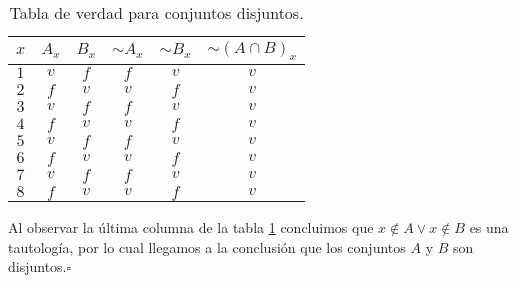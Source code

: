 \begin{table}[H]
\centering

\caption{Tabla de verdad para conjuntos disjuntos.}

\setlength\arrayrulewidth{1pt} 

\begin{tabular}{ccccc|c}
\arrayrulecolor{ptctitle}\hline\cellcolor{ptctitle!50}$x$ &
\cellcolor{ptctitle!50}$A_{x}$ &
\cellcolor{ptctitle!50}$B_{x}$ &
\cellcolor{ptctitle!50}$\sim A_{x}$ &
\cellcolor{ptctitle!50}$\sim B_{x}$ &
\cellcolor{ptctitle!50}$\sim\left(A\cap B\right)_{x}$\tabularnewline
\hline\cellcolor{ptcbackground}$1$ &
\cellcolor{ptcbackground} $v$ &
\cellcolor{ptcbackground} $f$ &
\cellcolor{ptcbackground} $f$ &
\cellcolor{ptcbackground} $v$ &
\cellcolor{ptcbackground}$v$\tabularnewline
\hline\cellcolor{gray!50}$2$ &
\cellcolor{gray!50} $f$ &
\cellcolor{gray!50} $v$ &
\cellcolor{gray!50} $v$ &
\cellcolor{gray!50} $f$ &
\cellcolor{gray!50}$v$\tabularnewline
\hline\cellcolor{ptcbackground}$3$ &
\cellcolor{ptcbackground} $v$ &
\cellcolor{ptcbackground} $f$ &
\cellcolor{ptcbackground} $f$ &
\cellcolor{ptcbackground} $v$ &
\cellcolor{ptcbackground} $v$\tabularnewline
\hline\cellcolor{gray!50}$4$ &
\cellcolor{gray!50} $f$ &
\cellcolor{gray!50} $v$ &
\cellcolor{gray!50} $v$ &
\cellcolor{gray!50} $f$ &
\cellcolor{gray!50} $v$\tabularnewline
\hline\cellcolor{ptcbackground}$5$ &
\cellcolor{ptcbackground} $v$ &
\cellcolor{ptcbackground} $f$ &
\cellcolor{ptcbackground} $f$ &
\cellcolor{ptcbackground} $v$ &
\cellcolor{ptcbackground} $v$\tabularnewline
\hline\cellcolor{gray!50}$6$ &
\cellcolor{gray!50} $f$ &
\cellcolor{gray!50} $v$ &
\cellcolor{gray!50} $v$ &
\cellcolor{gray!50} $f$ &
\cellcolor{gray!50} $v$\tabularnewline
\hline\cellcolor{ptcbackground}$7$ &
\cellcolor{ptcbackground} $v$ &
\cellcolor{ptcbackground} $f$ &
\cellcolor{ptcbackground} $f$ &
\cellcolor{ptcbackground} $v$ &
\cellcolor{ptcbackground} $v$\tabularnewline
\hline\cellcolor{gray!50}$8$ &
\cellcolor{gray!50} $f$ &
\cellcolor{gray!50} $v$ &
\cellcolor{gray!50} $v$ &
\cellcolor{gray!50} $f$ &
\cellcolor{gray!50} $v$\tabularnewline
\end{tabular}

\label{tdisj}
\end{table}

Al observar la última columna de la tabla \ref{tdisj} concluimos
que $x\notin A\vee x\notin B$ es una tautología, por lo cual llegamos
a la conclusión que los conjuntos $A$ y $B$ son disjuntos.\hfill $\square$ 

